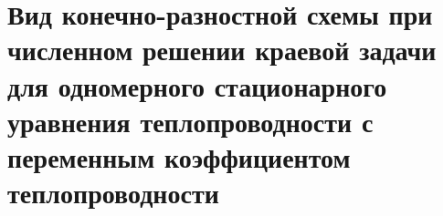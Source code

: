 \documentclass[__main__.tex]{subfiles}
\begin{document}
\section{Вид конечно-разностной схемы при численном решении краевой задачи для одномерного стационарного уравнения теплопроводности с переменным коэффициентом теплопроводности}
\end{document}
